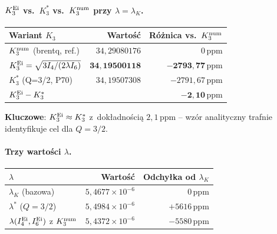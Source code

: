 \paragraph{$K_3^{\rm Ei}$ vs.\ $K_3^*$ vs.\ $K_3^{\rm num}$ przy $\lambda = \lambda_K$.}
\begin{center}
\begin{tabular}{l|r|r}
\hline
Wariant $K_3$ & Warto\'s\'c & R\'o\.znica vs.\ $K_3^{\rm num}$ \\
\hline
$K_3^{\rm num}$ (brentq, ref.) & $34{,}29080176$ & $0\,\mathrm{ppm}$ \\
$K_3^{\rm Ei} = \sqrt{3I_4/(2\lambda I_6)}$ & $\mathbf{34{,}19500118}$ & $\mathbf{-2793{,}77\,\mathrm{ppm}}$ \\
$K_3^*$ (Q=3/2, P70) & $34{,}19507308$ & $-2791{,}67\,\mathrm{ppm}$ \\
\hline
$K_3^{\rm Ei} - K_3^*$ & & $\mathbf{-2{,}10\,\mathrm{ppm}}$ \\
\hline
\end{tabular}
\end{center}
\textbf{Kluczowe}: $K_3^{\rm Ei} \approx K_3^*$ z~dok\l{}adno\'sci\k{a} $2{,}1\,\mathrm{ppm}$ -- wz\'or analityczny
trafnie identyfikuje cel dla $Q=3/2$.

\paragraph{Trzy warto\'sci $\lambda$.}
\begin{center}
\begin{tabular}{l|r|r}
\hline
$\lambda$ & Warto\'s\'c & Odchy\l{}ka od $\lambda_K$ \\
\hline
$\lambda_K$ (bazowa) & $5{,}4677\times10^{-6}$ & $0\,\mathrm{ppm}$ \\
$\lambda^*$ ($Q=3/2$) & $5{,}4984\times10^{-6}$ & $+5616\,\mathrm{ppm}$ \\
$\lambda(I_4^{\rm Ei},I_6^{\rm Ei})$ z $K_3^{\rm num}$ & $5{,}4372\times10^{-6}$ & $-5580\,\mathrm{ppm}$ \\
\hline
\end{tabular}
\end{center}

